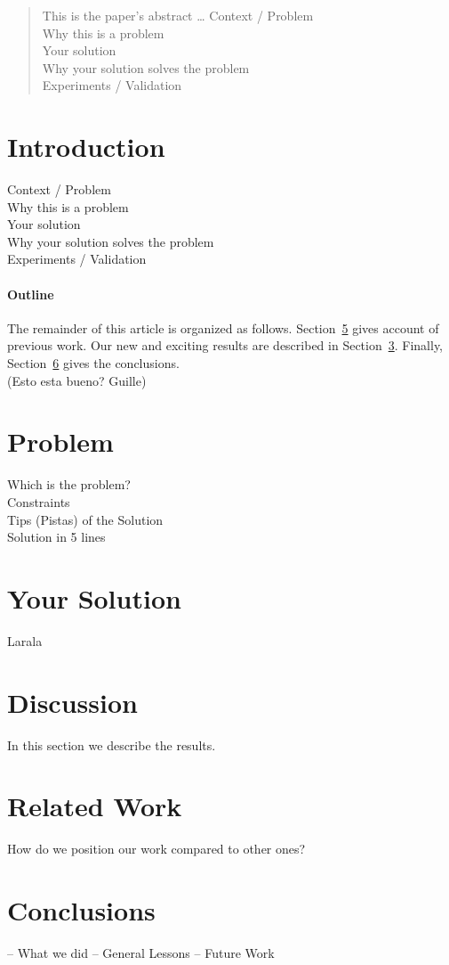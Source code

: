 \documentclass[12pt]{article}
\begin{document}
\maketitle

\begin{abstract}
This is the paper's abstract \ldots
Context / Problem\\
Why this is a problem\\
Your solution\\
Why your solution solves the problem\\
Experiments / Validation\\
\end{abstract}

\section{Introduction}
Context / Problem\\
Why this is a problem\\
Your solution\\
Why your solution solves the problem\\
Experiments / Validation\\

\paragraph{Outline}
The remainder of this article is organized as follows.\cite{Gil:02}
Section~\ref{related work} gives account of previous work.
Our new and exciting results are described in Section~\ref{your solution}.
Finally, Section~\ref{conclusions} gives the conclusions.\\
 (Esto esta bueno? Guille)

\section{Problem}\label{problem}
Which is the problem?\\
Constraints\\
Tips (Pistas) of the Solution\\
Solution in 5 lines\\

\section{Your Solution}\label{your solution}
Larala

\section{Discussion}\label{Discussion}
In this section we describe the results.

\section{Related Work}\label{related work}
How do we position our work compared to other ones?

\section{Conclusions}\label{conclusions}
– What we did
– General Lessons
– Future Work



\end{document}
